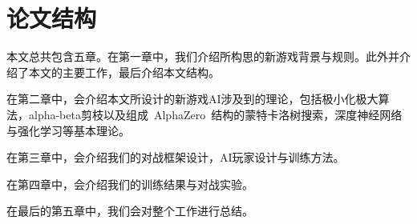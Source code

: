\section{论文结构}
本文总共包含五章。在第一章中，我们介绍所构思的新游戏背景与规则。此外并介绍了本文的主要工作，最后介绍本文结构。

在第二章中，会介绍本文所设计的新游戏AI涉及到的理论，包括极小化极大算法，alpha-beta剪枝以及组成~AlphaZero~结构的蒙特卡洛树搜索，深度神经网络与强化学习等基本理论。

在第三章中，会介绍我们的对战框架设计，AI玩家设计与训练方法。

在第四章中，会介绍我们的训练结果与对战实验。

在最后的第五章中，我们会对整个工作进行总结。

